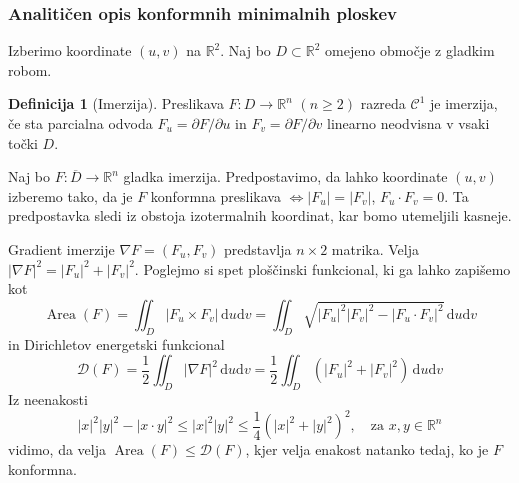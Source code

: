 \documentclass[8pt]{beamer}
\theoremstyle{definition}
\newtheorem{definicija}{Definicija}
\theoremstyle{remark}
\theoremstyle{plain}
\numberwithin{equation}{section}  %
\begin{document}
\begin{frame}
    \frametitle{Analitičen opis konformnih minimalnih ploskev}

    Izberimo koordinate $(u,v)$ na $\mathbb{R}^2$. Naj bo $D \subset \mathbb{R}^2$ omejeno območje z gladkim robom. 
    \begin{definicija}[Imerzija]
        Preslikava $F: D \rightarrow \mathbb{R}^n$ $(n \geq 2)$ razreda $\mathscr{C}^1$ je \textcolor{red1}{imerzija}, če sta parcialna odvoda $F_u=\partial F / \partial u$ in $F_v=\partial F / \partial v$ linearno neodvisna v vsaki točki $D$. 
    \end{definicija}
    \pause 
    Naj bo $F: \overline{D} \rightarrow \mathbb{R}^n$ gladka imerzija. Predpostavimo, da lahko koordinate $(u,v)$ izberemo tako, da je $F$ \textcolor{red1}{konformna preslikava} $\Leftrightarrow \left|F_u\right|=\left|F_v\right|$, $F_u \cdot F_v=0$. Ta predpostavka sledi iz obstoja izotermalnih koordinat, kar bomo utemeljili kasneje. 
    \pause
    \vspace{0.8em} 
    
    Gradient imerzije $\nabla F=\left(F_u, F_v\right)$ predstavlja $n \times 2$ matrika. Velja $|\nabla F|^2=\left|F_u\right|^2+\left|F_v\right|^2$. 
    Poglejmo si spet \textcolor{red1}{ploščinski funkcional}, ki ga lahko zapišemo kot
    \begin{equation*}
        \operatorname{Area}(F)=\iint_D\left|F_u \times F_v\right| \, \mathrm{d} u \mathrm{d} v=\iint_D \sqrt{\left|F_u\right|^2\left|F_v\right|^2-\left|F_u \cdot F_v\right|^2} \, \mathrm{d} u \mathrm{d} v
    \end{equation*}
    in \textcolor{red1}{Dirichletov energetski funkcional}
    \begin{equation*}
        \mathscr{D}(F)=\frac{1}{2} \iint_D|\nabla F|^2 \, \mathrm{d} u \mathrm{d} v=\frac{1}{2} \iint_D\left(\left|F_u\right|^2+\left|F_v\right|^2\right) \, \mathrm{d} u \mathrm{d} v
    \end{equation*}
    \pause
    Iz neenakosti 
    \begin{equation*}
        |x|^2|y|^2-|x \cdot y|^2 \leq|x|^2|y|^2 \leq \frac{1}{4}\left(|x|^2+|y|^2\right)^2, \quad \text{za }x, y \in \mathbb{R}^n         
    \end{equation*}
    vidimo, da velja $\operatorname{Area}(F) \leq \mathscr{D}(F)$, kjer velja enakost natanko tedaj, ko je $F$ konformna. 
    
\end{frame}
\end{document}
